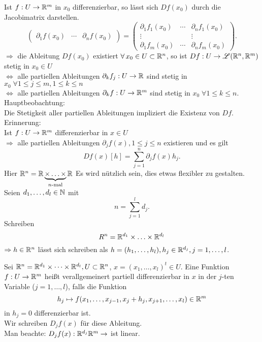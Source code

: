 \documentclass[../ana2.tex]{subfiles}
\begin{document}
Ist \(f:U\rightarrow \mathbb{R}^m \) in \(x_0\) differenzierbar, so lässt 
sich \(Df(x_0)\) durch die Jacobimatrix darstellen.
\[ \begin{pmatrix}
    \partial_1 f(x_0) & \cdots & \partial_n f(x_0)
\end{pmatrix} = \begin{pmatrix}
    \partial_1 f_1(x_0) & \cdots & \partial_n f_1(x_0) \\
    \vdots && \vdots \\
    \partial_1 f_m(x_0) & \cdots & \partial_n f_m(x_0)
\end{pmatrix}. \]
\( \Rightarrow \) die Ableitung \( Df(x_0) \) existiert 
\( \forall x_0 \in U \subset \R^n \), so ist 
\( Df:U\rightarrow \mathscr{L}(\mathbb{R}^n, \mathbb{R}^m) \) 
stetig in \( x_0 \in U \) \\
\( \Leftrightarrow \) alle partiellen Ableitungen 
\( \partial_k f_j:U\rightarrow \mathbb{R} \) sind stetig in 
\(x_0 \; \forall 1 \leq j \leq m, 1 \leq k \leq n \) \\
\( \Leftrightarrow \) alle partiellen Ableitungen 
\( \partial_k f:U\rightarrow \mathbb{R}^m \)
sind stetig in \(x_0 \; \forall 1 \leq k \leq n\).
Hauptbeobachtung:\\
Die Stetigkeit aller partiellen Ableitungen 
impliziert die Existenz von \(Df\).\\
Erinnerung: \\
Ist \(f:U\rightarrow \mathbb{R}^m\)
differenzierbar in \( x\in U \)\\
\( \Rightarrow \) alle partiellen Ableitungen 
\( \partial_j f(x), 1 \leq j \leq n \) existieren
und es gilt
\[ Df(x)[h] = \sum_{j=1}^n \partial_j f(x) h_j. \]
Hier \( \mathbb{R}^n = \mathbb{R} \underbrace{\times \ldots \times}_{n\text{-mal}} \mathbb{R} \)
Es wird nützlich sein, dies etwas flexibler zu 
gestalten.\\
Seien \( d_1, \ldots, d_l \in \mathbb{N} \) mit
\[ n = \sum_{j=1}^l d_j. \]
Schreiben 
\[ R^n = \mathbb{R}^{d_1} \times \ldots \times \mathbb{R}^{d_l} \]
\( \Rightarrow h \in \mathbb{R}^n \) lässt sich schreiben
als \( h = (h_1,\ldots, h_l), h_j \in \mathbb{R}^{d_j}, j=1,\ldots,l \).
\begin{defi*}
    Sei \( \mathbb{R}^n = \mathbb{R}^{d_1} \times \dots \times \mathbb{R}^{d_l}, U \subset \mathbb{R}^n \),
    \( x = (x_1, \ldots, x_l)^t \in U \).
    Eine Funktion \( f:U\rightarrow \mathbb{R}^m \) heißt verallgemeinert
    partiell differenzierbar in \(x\) in der \(j\)-ten 
    Variable (\(j = 1, \ldots, l\)), falls die Funktion 
    \[ h_j \mapsto f(x_1,\ldots, x_{j-1}, x_j + h_j, 
    x_{j+1}, \ldots, x_l) \in \mathbb{R}^m \] 
    in \( h_j = 0 \) differenzierbar ist.\\
    Wir schreiben \(D_jf(x)\) für diese Ableitung.\\
    Man beachte: \( D_jf(x):\mathbb{R}^{d_j}{\mathbb{R}^m}\rightarrow \) ist linear.
\end{defi*}
\end{document}
